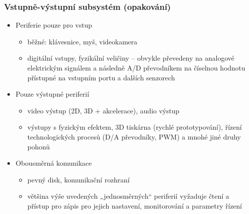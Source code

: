 \documentclass{beamer}
\begin{document}
\begin{frame}
\frametitle{Vstupně-výstupní subsystém (opakování)}

\begin{itemize}
 \item Periferie pouze pro vstup
 \begin{itemize}
  \item  běžné: klávesnice, myš, videokamera
  \item digitální vstupy, fyzikální veličiny -- obvykle převedeny na analogové
elektrickým signálem a následně A/D převodníkem na číselnou hodnotu
přístupné na vstupním portu a dalších senzorech
 \end{itemize}
\end{itemize}
\begin{itemize}
 \item Pouze výstupné periferií
 \begin{itemize}
  \item video výstup (2D, 3D + akcelerace), audio výstup
  \item výstupy s fyzickým efektem, 3D tiskárna (rychlé prototypování),
řízení technologických procesů (D/A převodníky, PWM) a mnohé
jiné druhy pohonů
 \end{itemize}
\end{itemize}
\begin{itemize}
 \item Obousměrná komunikace
 \begin{itemize}
  \item pevný disk, komunikační rozhraní
  \item většina výše uvedených „jednosměrných“ periferií vyžaduje čtení
a přístup pro zápis pro jejich nastavení, monitorování a parametry
řízení
 \end{itemize}
\end{itemize}
\end{frame}
\end{document}
